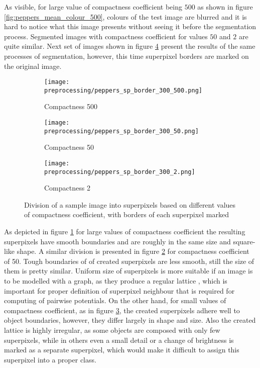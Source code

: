 As visible, for large value of compactness coefficient being $500$ as shown in figure \ref{fig:peppers_mean_colour_500}, colours of the test image are blurred and it is hard to notice what this image presents without seeing it before the segmentation process. Segmented images with compactness coefficient for values $50$ and $2$ are quite similar.
Next set of images shown in figure \ref{fig:peppers_boundaries} present the results of the same processes of segmentation, however, this time superpixel borders are marked on the original image.
\begin{figure}[ht]
 \centering
  \begin{subfigure}[h]{0.32\textwidth}
    \texttt{[image: preprocessing/peppers\_sp\_border\_300\_500.png]}
    \caption{Compactness 500}
    \label{fig:peppers_boundaries_500}
  \end{subfigure}
  \begin{subfigure}[h]{0.32\textwidth}
    \texttt{[image: preprocessing/peppers\_sp\_border\_300\_50.png]}
    \caption{Compactness 50}
    \label{fig:peppers_boundaries_50}
  \end{subfigure}
    \begin{subfigure}[h]{0.32\textwidth}
    \texttt{[image: preprocessing/peppers\_sp\_border\_300\_2.png]}
    \caption{Compactness 2}
    \label{fig:peppers_boundaries_2}
  \end{subfigure}
     \caption{Division of a sample image into superpixels based on different values of compactness coefficient, with borders of each superpixel marked}%
    \label{fig:peppers_boundaries}       
\end{figure}
As depicted in figure \ref{fig:peppers_boundaries_500} for large values of compactness coefficient the resulting superpixels have smooth boundaries and are roughly in the same size and square-like shape. A similar division is presented in figure \ref{fig:peppers_boundaries_50} for compactness coefficient of 50. Tough boundaries of of created superpixels are less smooth, still the size of them is pretty similar. Uniform size of superpixels is more suitable if an image is to be modelled with a graph, as they produce a regular lattice \cite{superpixels_compactness}, which is important for proper definition of superpixel neighbour that is required for computing of pairwise potentials. On the other hand, for small values of compactness coefficient, as in figure \ref{fig:peppers_boundaries_2}, the created superpixels adhere well to object boundaries, however, they differ largely in shape and size. Also the created lattice is highly irregular, as some objects are composed with only few superpixels, while in others even a small detail or a change of brightness is marked as a separate superpixel, which would make it difficult to assign this superpixel into a proper class.
